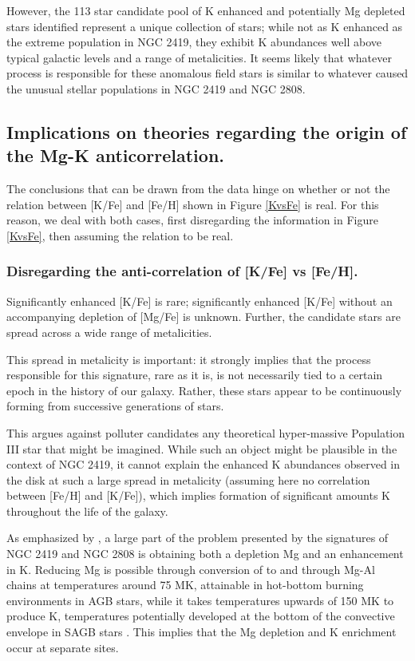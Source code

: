 \documentclass[a4paper,fleqn,usenatbib]{mnras}
\begin{document}
However, the 113 star candidate pool of K enhanced and potentially Mg depleted stars identified represent a unique collection of stars; while not as K enhanced as the extreme population in NGC 2419, they exhibit K abundances well above typical galactic levels and a range of metalicities. It seems likely that whatever process is responsible for these anomalous field stars is similar to whatever caused the unusual stellar populations in NGC 2419 and NGC 2808.

\subsection{Implications on theories regarding the origin of the Mg-K anticorrelation.}

The conclusions that can be drawn from the data hinge on whether or not the relation between [K/Fe] and [Fe/H] shown in Figure \ref{KvsFe} is real. For this reason, we deal with both cases, first disregarding the information in Figure \ref{KvsFe}, then assuming the relation to be real.

\subsubsection{Disregarding the anti-correlation of [K/Fe] vs [Fe/H].}

Significantly enhanced [K/Fe] is rare; significantly enhanced [K/Fe] without an accompanying depletion of [Mg/Fe] is unknown. Further, the candidate stars are spread across a wide range of metalicities.

This spread in metalicity is important: it strongly implies that the process responsible for this signature, rare as it is, is not necessarily tied to a certain epoch in the history of our galaxy. Rather, these stars appear to be continuously forming from successive generations of stars. 

This argues against polluter candidates any theoretical hyper-massive Population III star that might be imagined. While such an object might be plausible in the context of NGC 2419, it cannot explain the enhanced K abundances observed in the disk at such a large spread in metalicity (assuming here no correlation between [Fe/H] and [K/Fe]), which implies formation of significant amounts K throughout the life of the galaxy.

As emphasized by \cite{prantzos2017}, a large part of the problem presented by the signatures of NGC 2419 and NGC 2808 is obtaining both a depletion Mg and an enhancement in K. Reducing Mg is possible through conversion of  to  and through Mg-Al chains at temperatures around 75 MK, attainable in hot-bottom burning environments in AGB stars, while it takes temperatures upwards of 150 MK to produce K, temperatures potentially developed at the bottom of the convective envelope in SAGB stars \citep{iliadis2016}. This implies that the Mg depletion and K enrichment occur at separate sites.
\end{document}
